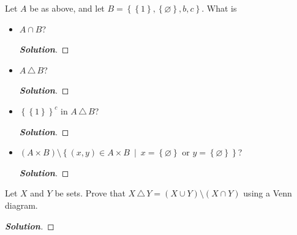 \documentclass[11pt]{article}
\newenvironment{problem}[2][Problem\!]{\begin{trivlist}
\item[\hskip \labelsep {\bfseries #1}\hskip \labelsep {\bfseries #2.}]}{\end{trivlist}}
\newenvironment{solution}{\begin{proof}[\textbf{\textit{Solution}}]}{\end{proof}}
\newcommand{\set}[1]{\left\{#1\right\}} %
\newcommand{\setp}[2]{\left\{#1\ \middle|\ #2\right\}} %
\renewcommand{\emptyset}{\varnothing}
\begin{document}
\newpage %

\begin{problem}{1.2}
Let $A$ be as above, and let $B = \set{\set{1},\set{\emptyset},b,c}$. What is
\begin{itemize}[itemsep=3em]
\item[(a)] $A \cap B$?
\begin{solution}\hfill %
\end{solution}

\item[(b)] $A\, \triangle\, B$?
\begin{solution}\hfill %
\end{solution}

\item[(c)] $\set{\set{1}}^c$ in $A\, \triangle\, B$?
\begin{solution}\hfill %
\end{solution}

\item[(d)] $(A \times B) \setminus \setp{(x,y) \in A \times B}{x = \set{\emptyset} \text{ or } y = \set{\emptyset}}$?
\begin{solution}\hfill %
\end{solution}

\end{itemize}
\end{problem}

\newpage  %

\begin{problem}{1.3}
Let $X$ and $Y$ be sets. Prove that $X\, \triangle\, Y = (X \cup Y) \setminus (X \cap Y)$ using a Venn diagram. 
\end{problem}
\begin{solution}\hfill %
\end{solution}
\end{document}
